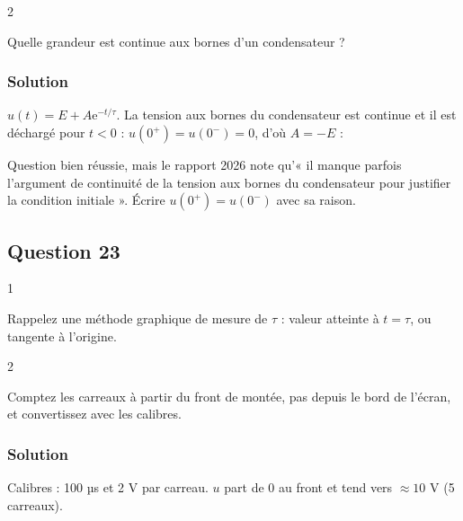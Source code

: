 \documentclass[11pt,a4paper]{article}
\newcommand{\equationajustee}[1]{%
  \sbox{\boiteequation}{$\displaystyle #1$}%
  \ifdim\wd\boiteequation>\linewidth
    \[\resizebox{\linewidth}{!}{\usebox{\boiteequation}}\]%
  \else
    \[#1\]%
  \fi}
\begin{document}
\begin{indication}{2}

Quelle grandeur est continue aux bornes d'un condensateur ?

\end{indication}

\hypertarget{solution-21}{%
\subsubsection{Solution}\label{solution-21}}

\(u(t)=E+A{\mathrm{e}}^{-t/\tau}\). La tension aux bornes du condensateur est continue et il est déchargé pour \(t<0\) : \(u(0^+)=u(0^-)=0\), d'où \(A=-E\) :

\equationajustee{\boxed{u(t)=E\left(1-{\mathrm{e}}^{-t/\tau}\right)}}

\begin{jury}

Question bien réussie, mais le rapport 2026 note qu'« il manque parfois l'argument de continuité de la tension aux bornes du condensateur pour justifier la condition initiale ». Écrire \(u(0^+)=u(0^-)\) avec sa raison.

\end{jury}

\hypertarget{question-23}{%
\subsection{Question 23}\label{question-23}}

\begin{indication}{1}

Rappelez une méthode graphique de mesure de \(\tau\) : valeur atteinte à \(t=\tau\), ou tangente à l'origine.

\end{indication}

\begin{indication}{2}

Comptez les carreaux à partir du front de montée, pas depuis le bord de l'écran, et convertissez avec les calibres.

\end{indication}

\hypertarget{solution-22}{%
\subsubsection{Solution}\label{solution-22}}

Calibres : 100 µs et 2 V par carreau. \(u\) part de 0 au front et tend vers \(\approx10\) V (5 carreaux).
\end{document}

